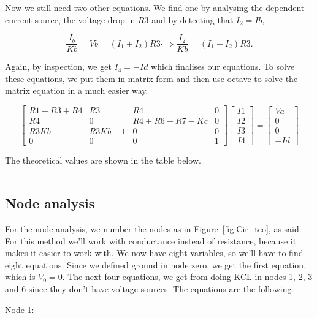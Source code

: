 \par Now we still need two other equations. We find one by analysing the dependent current source, the voltage drop in $R3$ and by detecting that $I_2=Ib$,

 \begin{equation}
  \frac{I_b}{Kb} = Vb = (I_1 + I_2)R3 \cdot \Rightarrow \frac{I_2}{Kb} = (I_1 + I_2)R3.
  \label{eq:Vb}
\end{equation}

\par Again, by inspection, we get $I_4 = -Id$ which finalises our equations.
To solve these equations, we put them in matrix form and then use octave to solve the matrix equation in a much easier way.

$$
\begin{bmatrix}
R1+R3+R4 & R3 & R4 & 0 \\
R4 & 0 & R4+R6+R7-Kc & 0 \\
R3Kb & R3Kb-1 & 0 & 0 \\
0 & 0 & 0 & 1 
\end{bmatrix}
\begin{bmatrix}
I1 \\
I2 \\
I3 \\
I4 
\end{bmatrix}
=
\begin{bmatrix}
Va \\
0 \\
0 \\
-Id
\end{bmatrix}
$$

\par The theoretical values are shown in the table below.
\vspace{5mm}
\begin{table}[H]
\centering
\begin{tabularx}{0.8\textwidth} {
  | >{\raggedright\arraybackslash}X
  | >{\raggedleft\arraybackslash}X | }
 \hline

\end{tabularx}
\end{table}
\vspace{5mm}

\subsection{Node analysis}
\label{ssec:Node analysis}

\par For the node analysis, we number the nodes as in Figure~\ref{fig:Cir_teo}, as said. For this method we'll work with conductance instead of resistance, because it makes it easier to work with. We now have eight variables, so we'll have to find eight equations. Since we defined ground in node zero, we get the first equation, which is $V_0=0$. The next four equations, we get from doing KCL in nodes 1, 2, 3 and 6 since they don't have voltage sources. The equations are the following\\
\vspace{5mm}
\par Node 1:

